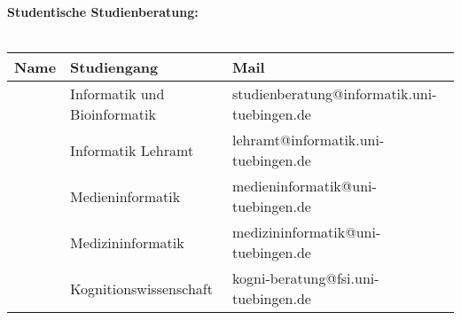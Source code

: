 \textbf{Studentische Studienberatung:}\\\\
\begin{tabular}{|lll|}
	\hline
	Name & Studiengang & Mail\\
	\hline
	\hline
	\studBeratungInfo    & Informatik und Bioinformatik & studienberatung@informatik.uni-tuebingen.de\footnotemark[\value{footnote}] \\
	\studBeratungLehramt & Informatik Lehramt & lehramt@informatik.uni-tuebingen.de\footnotemark[\value{footnote}] \\
	\studBeratungMedien  & Medieninformatik             & medieninformatik@uni-tuebingen.de\footnotemark[\value{footnote}]  \\
	\studBeratungMedizin & Medizininformatik            & medizininformatik@uni-tuebingen.de\footnotemark[\value{footnote}] \\
	\studBeratungKogni   & Kognitionswissenschaft & kogni-beratung@fsi.uni-tuebingen.de\footnotemark[\value{footnote}] \\
	\hline
\end{tabular}
\vfill 
{}
\normalsize
